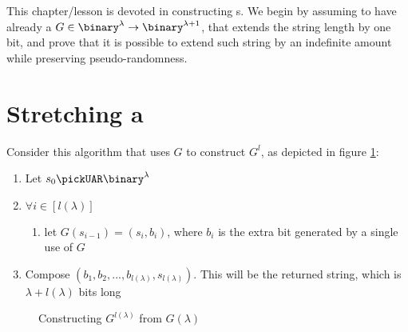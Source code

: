 
This chapter/lesson is devoted in constructing \prg{}s. We begin by assuming to have already a \prg{} $G \in \binary^\lambda \to \binary^{\lambda + 1}$, that extends the string length by one bit, and prove that it is possible to extend such string by an indefinite amount while preserving pseudo-randomness.

\section{Stretching a \prg}

Consider this algorithm that uses $G$ to construct $G^l$, as depicted in figure \ref{fig:gpowerl}:

\begin{enumerate}
    \item Let $s_0 \pickUAR \binary^\lambda$
    \item $\forall i \in [l(\lambda)]$ %
    \begin{enumerate}
        \item let $G(s_{i-1}) = (s_i, b_i)$, where $b_i$ is the extra bit generated by a single use of $G$
    \end{enumerate}
    \item Compose $(b_{1}, b_{2}, ..., b_{{l(\lambda)}}, s_{{l(\lambda)}})$. This will be the returned string, which is $\lambda + l(\lambda)$ bits long
\end{enumerate}

\begin{figure}[h]
    \caption{Constructing $G^{l(\lambda)}$ from $G(\lambda)$}
    \label{fig:gpowerl}
\end{figure}


